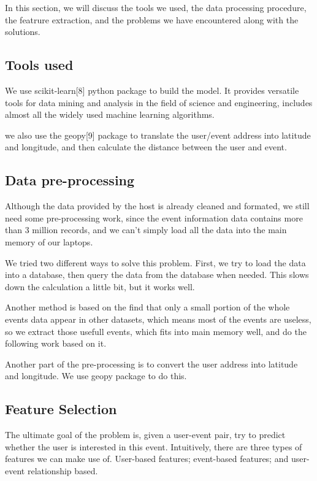 \documentclass{article} %
\begin{document}
In this section, we will discuss the tools we used, the data processing procedure, the featrure extraction, and the problems we have encountered along with the solutions.

\subsection{Tools used}
We use scikit-learn[8] python package to build the model. It provides versatile tools for data mining and analysis in the field of science and engineering, includes almost all the widely used machine learning algorithms. 

we also use the geopy[9] package to translate the user/event address into latitude and longitude, and then calculate the distance between the user and event. 


\subsection{Data pre-processing}

Although the data provided by the host is already cleaned and formated, we still need some pre-processing work, since the event information data contains more than 3 million records, and we can't simply load all the data into the main memory of our laptops. 

We tried two different ways to solve this problem. First, we try to load the data into a database, then query the data from the database when needed. This slows down the calculation a little bit, but it works well. 

Another method is based on the find that only a small portion of the whole events data appear in other datasets, which means most of the events are useless, so we extract those usefull events, which fits into main memory well,  and do the following work based on it. 

Another part of the pre-processing is to convert the user address into latitude and longitude. We use geopy package to do this.

\subsection{Feature Selection}

The ultimate goal of the problem is, given a user-event pair, try to predict whether the user is interested in this event. Intuitively, there are three types of features we can make use of. User-based features; event-based features; and user-event relationship based. 
\end{document}

